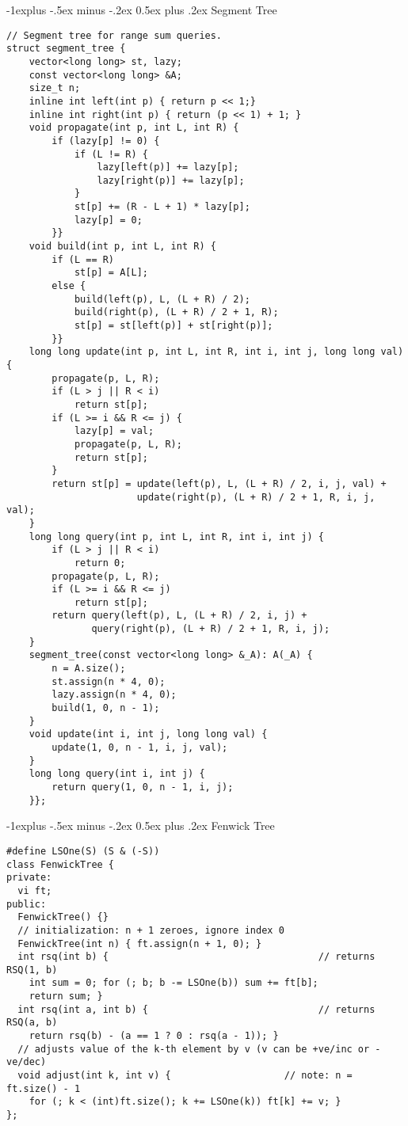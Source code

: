 \documentclass[10pt,landscape]{article}
\makeatletter
\renewcommand{\subsection}{\@startsection{subsection}{2}{0mm}%
                                {-1explus -.5ex minus -.2ex}%
                                {0.5ex plus .2ex}%
                                {\normalfont\normalsize\bfseries}}
\makeatother
\begin{document}
\begin{multicols}{2}
\subsection{Segment Tree}
\begin{lstlisting}
// Segment tree for range sum queries.
struct segment_tree {
    vector<long long> st, lazy;
    const vector<long long> &A;
    size_t n;
    inline int left(int p) { return p << 1;}
    inline int right(int p) { return (p << 1) + 1; }
    void propagate(int p, int L, int R) {
        if (lazy[p] != 0) {
            if (L != R) {
                lazy[left(p)] += lazy[p];
                lazy[right(p)] += lazy[p];
            }
            st[p] += (R - L + 1) * lazy[p];
            lazy[p] = 0;
        }}
    void build(int p, int L, int R) {
        if (L == R)
            st[p] = A[L];
        else {
            build(left(p), L, (L + R) / 2);
            build(right(p), (L + R) / 2 + 1, R);
            st[p] = st[left(p)] + st[right(p)];
        }}
    long long update(int p, int L, int R, int i, int j, long long val) {
        propagate(p, L, R);
        if (L > j || R < i)
            return st[p];
        if (L >= i && R <= j) {
            lazy[p] = val;
            propagate(p, L, R);
            return st[p];
        }
        return st[p] = update(left(p), L, (L + R) / 2, i, j, val) + 
                       update(right(p), (L + R) / 2 + 1, R, i, j, val);
    }
    long long query(int p, int L, int R, int i, int j) {
        if (L > j || R < i)
            return 0;
        propagate(p, L, R);
        if (L >= i && R <= j)
            return st[p];
        return query(left(p), L, (L + R) / 2, i, j) +
               query(right(p), (L + R) / 2 + 1, R, i, j);
    }
    segment_tree(const vector<long long> &_A): A(_A) {
        n = A.size();
        st.assign(n * 4, 0);
        lazy.assign(n * 4, 0);
        build(1, 0, n - 1);
    }
    void update(int i, int j, long long val) {
        update(1, 0, n - 1, i, j, val);
    }
    long long query(int i, int j) {
        return query(1, 0, n - 1, i, j);
    }};
\end{lstlisting}

\subsection{Fenwick Tree}
\begin{lstlisting}
#define LSOne(S) (S & (-S))
class FenwickTree {
private:
  vi ft;
public:
  FenwickTree() {}
  // initialization: n + 1 zeroes, ignore index 0
  FenwickTree(int n) { ft.assign(n + 1, 0); }
  int rsq(int b) {                                     // returns RSQ(1, b)
    int sum = 0; for (; b; b -= LSOne(b)) sum += ft[b];
    return sum; }
  int rsq(int a, int b) {                              // returns RSQ(a, b)
    return rsq(b) - (a == 1 ? 0 : rsq(a - 1)); }
  // adjusts value of the k-th element by v (v can be +ve/inc or -ve/dec)
  void adjust(int k, int v) {                    // note: n = ft.size() - 1
    for (; k < (int)ft.size(); k += LSOne(k)) ft[k] += v; }
};
\end{lstlisting}


\end{multicols}
\end{document}
